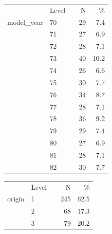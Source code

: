 \begin{center}
\begin{minipage}{\linewidth}
\begin{center}
\begin{tabular}{llrrr}
  \toprule
   & Level &   & N & \% \\ 
    \cmidrule{2-2} \cmidrule{4-5} 
 model\_year & 70 &  &  29 & 7.4 \\ 
   & 71 &  &  27 & 6.9 \\ 
   & 72 &  &  28 & 7.1 \\ 
   & 73 &  &  40 & 10.2 \\ 
   & 74 &  &  26 & 6.6 \\ 
   & 75 &  &  30 & 7.7 \\ 
   & 76 &  &  34 & 8.7 \\ 
   & 77 &  &  28 & 7.1 \\ 
   & 78 &  &  36 & 9.2 \\ 
   & 79 &  &  29 & 7.4 \\ 
   & 80 &  &  27 & 6.9 \\ 
   & 81 &  &  28 & 7.1 \\ 
   & 82 &  &  30 & 7.7 \\ 
   \bottomrule
\end{tabular}
\end{center}
\end{minipage}
\end{center}

\begin{center}
\begin{minipage}{\linewidth}
\begin{center}
\begin{tabular}{llrrr}
  \toprule
   & Level &   & N & \% \\ 
    \cmidrule{2-2} \cmidrule{4-5} 
 origin & 1 &  & 245 & 62.5 \\ 
   & 2 &  &  68 & 17.3 \\ 
   & 3 &  &  79 & 20.2 \\ 
   \bottomrule
\end{tabular}
\end{center}
\end{minipage}
\end{center}

